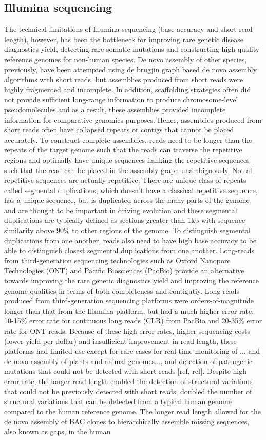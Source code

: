 \subsection{Illumina sequencing}
The technical limitations of Illumina sequencing (base accuracy and short read length), however, has been the bottleneck for improving rare genetic disease diagnostics yield, detecting rare somatic mutations and constructing high-quality reference genomes for non-human species. De novo assembly of other species, previously, have been attempted using de brugjin graph based de novo assembly algorithms with short reads, but assemblies produced from short reads were highly fragmented and incomplete. In addition, scaffolding strategies often did not provide sufficient long-range information to produce chromosome-level pseudomolecules and as a result, these assemblies provided incomplete information for comparative genomics purposes. Hence, assemblies produced from short reads often have collapsed repeats or contigs that cannot be placed accurately. To construct complete assemblies, reads need to be longer than the repeats of the target genome such that the reads can traverse the repetitive regions and optimally have unique sequences flanking the repetitive sequences such that the read can be placed in the assembly graph unambiguously. Not all repetitive sequences are actually repetitive. There are unique class of repeats called segmental duplications, which doesn't have a classical repetitive sequence, has a unique sequence, but is duplicated across the many parts of the genome and are thought to be important in driving evolution and these segmental duplications are typically defined as sections greater than 1kb with sequence similarity above 90\% to other regions of the genome. To distinguish segmental duplications from one another, reads also need to have high base accuracy to be able to distinguish closest segmental duplications from one another. Long-reads from third-generation sequencing technologies such as Oxford Nanopore Technologies (ONT) and Pacific Biosciences (PacBio) provide an alternative towards improving the rare genetic diagnostics yield and improving the reference genome qualities in terms of both completeness and contigutiy. Long-reads produced from third-generation sequencing platforms were orders-of-magnitude longer than that from the Illumina platform, but had a much higher error rate; 10-15\% error rate for continuous long reads (CLR) from PacBio and 20-35\% error rate for ONT reads. Because of these high error rates, higher sequencing costs (lower yield per dollar) and insufficient improvement in read length, these platforms had limited use except for rare cases for real-time monitoring of ... and de novo assembly of plants and animal genomes..., and detection of pathogenic mutations that could not be detected with short reads [ref, ref]. Despite high error rate, the longer read length enabled the detection of structural variations that could not be previously detected with short reads, doubled the number of structural variations that can be detected from a typical human genome compared to the human reference genome. The longer read length allowed for the de novo assembly of BAC clones to hierarchically assemble missing sequences, also known as gaps, in the human 